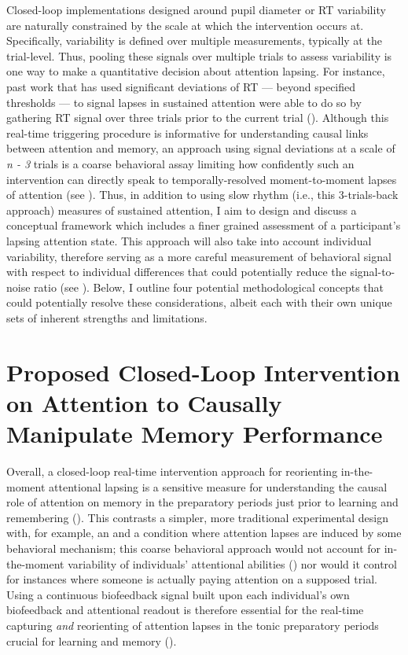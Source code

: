 Closed-loop implementations designed around pupil diameter or RT variability are naturally constrained by the scale at which the intervention occurs at. Specifically, variability is defined over multiple measurements, typically at the trial-level. Thus, pooling these signals over multiple trials to assess variability is one way to make a quantitative decision about attention lapsing. For instance, past work that has used significant deviations of RT --- beyond specified thresholds --- to signal lapses in sustained attention were able to do so by gathering RT signal over three trials prior to the current trial (\cite{debettencourt2019real}). Although this real-time triggering procedure is informative for understanding causal links between attention and memory, an approach using signal deviations at a scale of \emph{n - 3} trials is a coarse behavioral assay limiting how confidently such an intervention can directly speak to temporally-resolved moment-to-moment lapses of attention (see \cite{madore2020memory}). Thus, in addition to using slow rhythm (i.e., this 3-trials-back approach) measures of sustained attention, I aim to design and discuss a conceptual framework which includes a finer grained assessment of a participant's lapsing attention state. This approach will also take into account individual variability, therefore serving as a more careful measurement of behavioral signal with respect to individual differences that could potentially reduce the signal-to-noise ratio (see \cite{alkoby2018can}). Below, I outline four potential methodological concepts that could potentially resolve these considerations, albeit each with their own unique sets of inherent strengths and limitations.

\section{Proposed Closed-Loop Intervention on Attention to Causally Manipulate Memory Performance}
Overall, a closed-loop real-time intervention approach for reorienting in-the-moment attentional lapsing is a sensitive measure for understanding the causal role of attention on memory in the preparatory periods just prior to learning and remembering (\cite{megan2015closed}). This contrasts a simpler, more traditional experimental design with, for example, an  and a  condition where attention lapses are induced by some behavioral mechanism; this coarse behavioral approach would not account for in-the-moment variability of individuals' attentional abilities (\cite{drew2008neural}) nor would it control for instances where someone is actually paying attention on a supposed  trial. Using a continuous biofeedback signal built upon each individual's own biofeedback and attentional readout is therefore essential for the real-time capturing \emph{and} reorienting of attention lapses in the tonic preparatory periods crucial for learning and memory (\cite{madore2020memory}). 

